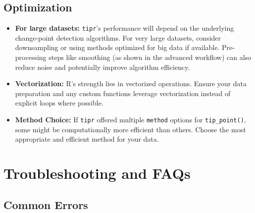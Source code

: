 \documentclass[
  10pt,
  letterpaper,
  DIV=11,
  numbers=noendperiod]{scrartcl}
\providecommand{\tightlist}{%
  \setlength{\itemsep}{0pt}\setlength{\parskip}{0pt}}
\begin{document}
\subsection{Optimization}\label{optimization}

\begin{itemize}
\tightlist
\item
  \textbf{For large datasets:} \texttt{tipr}'s performance will depend
  on the underlying change-point detection algorithms. For very large
  datasets, consider downsampling or using methods optimized for big
  data if available. Pre-processing steps like smoothing (as shown in
  the advanced workflow) can also reduce noise and potentially improve
  algorithm efficiency.
\item
  \textbf{Vectorization:} R's strength lies in vectorized operations.
  Ensure your data preparation and any custom functions leverage
  vectorization instead of explicit loops where possible.
\item
  \textbf{Method Choice:} If \texttt{tipr} offered multiple
  \texttt{method} options for \texttt{tip\_point()}, some might be
  computationally more efficient than others. Choose the most
  appropriate and efficient method for your data.
\end{itemize}

\section{Troubleshooting and FAQs}\label{troubleshooting-and-faqs}

\subsection{Common Errors}\label{common-errors}
\end{document}
